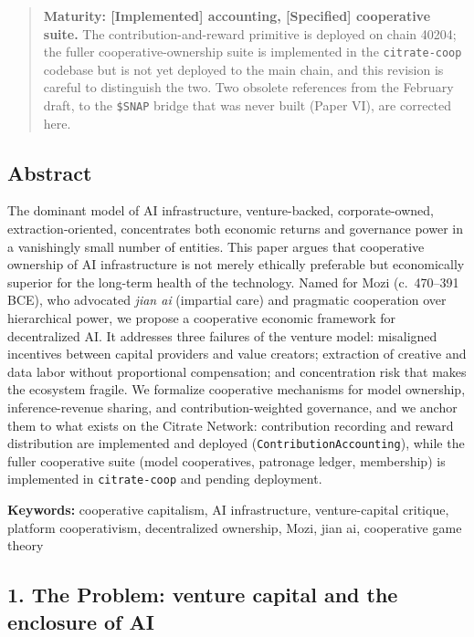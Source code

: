 \begin{quote}
\textbf{Maturity: {[}Implemented{]} accounting, {[}Specified{]}
cooperative suite.} The contribution-and-reward primitive is deployed on
chain 40204; the fuller cooperative-ownership suite is implemented in
the \texttt{citrate-coop} codebase but is not yet deployed to the main
chain, and this revision is careful to distinguish the two. Two obsolete
references from the February draft, to the \texttt{\$SNAP} bridge that
was never built (Paper VI), are corrected here.
\end{quote}

\subsection{Abstract}\label{abstract}

The dominant model of AI infrastructure, venture-backed,
corporate-owned, extraction-oriented, concentrates both economic returns
and governance power in a vanishingly small number of entities. This
paper argues that cooperative ownership of AI infrastructure is not
merely ethically preferable but economically superior for the long-term
health of the technology. Named for Mozi (c.~470--391 BCE), who
advocated \emph{jian ai} (impartial care) and pragmatic cooperation over
hierarchical power, we propose a cooperative economic framework for
decentralized AI. It addresses three failures of the venture model:
misaligned incentives between capital providers and value creators;
extraction of creative and data labor without proportional compensation;
and concentration risk that makes the ecosystem fragile. We formalize
cooperative mechanisms for model ownership, inference-revenue sharing,
and contribution-weighted governance, and we anchor them to what exists
on the Citrate Network: contribution recording and reward distribution
are implemented and deployed (\texttt{ContributionAccounting}), while
the fuller cooperative suite (model cooperatives, patronage ledger,
membership) is implemented in \texttt{citrate-coop} and pending
deployment.

\textbf{Keywords:} cooperative capitalism, AI infrastructure,
venture-capital critique, platform cooperativism, decentralized
ownership, Mozi, jian ai, cooperative game theory

\subsection{1. The Problem: venture capital and the enclosure of
AI}\label{the-problem-venture-capital-and-the-enclosure-of-ai}

